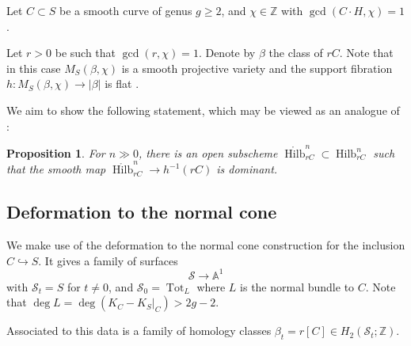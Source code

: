 \documentclass{amsart}
\theoremstyle{plain}
\newtheorem{proposition}[theorem]{Proposition}
\theoremstyle{definition}
\theoremstyle{remark}
\begin{document}
Let $C\subset S$ be a smooth curve of genus $g\ge2$, and $\chi\in\mathbb Z$ with $\gcd(C\cdot H,\chi)=1$.

Let $r>0$ be such that $\gcd(r,\chi)=1$.
Denote by $\beta$ the class of $rC$.
Note that in this case $M_S(\beta,\chi)$ is a smooth projective variety and the support fibration $h:M_S(\beta,\chi)\to |\beta|$ is flat \cite{yuan2023}.

We aim to show the following statement, which may be viewed as an analogue of :
\begin{proposition}\label{prop:delpezzogreg}
    For $n\gg0$, there is an open subscheme $\mathring{\operatorname{Hilb}}^n_{rC}\subset\operatorname{Hilb}^n_{rC}$ such that the smooth map $\mathring{\operatorname{Hilb}}^n_{rC}\rightarrow h^{-1}(rC)$ is dominant. 
\end{proposition}
\subsection{Deformation to the normal cone}
We make use of the deformation to the normal cone construction for the inclusion $C\hookrightarrow S$.
It gives a family of surfaces
\[\mathcal S\rightarrow \mathbb{A}^1\]
with $\mathcal S_t=S$ for $t\neq 0$, and $\mathcal S_0 = \operatorname{Tot}_L$ where $L$ is the normal bundle to $C$.
Note that $\deg L=\deg(K_C-K_S|_C)>2g-2$.

Associated to this data is a family of homology classes $\beta_t=r[C]\in H_2(\mathcal S_t;\mathbb Z)$.
\end{document}
